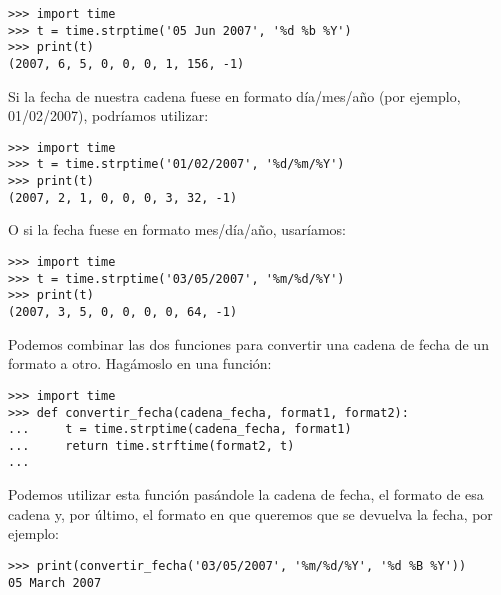 \begin{listingignore}
\begin{verbatim}
>>> import time
>>> t = time.strptime('05 Jun 2007', '%d %b %Y')
>>> print(t)
(2007, 6, 5, 0, 0, 0, 1, 156, -1)
\end{verbatim}
\end{listingignore}

\noindent
Si la fecha de nuestra cadena fuese en formato día/mes/año (por ejemplo, 01/02/2007), podríamos utilizar:

\begin{listingignore}
\begin{verbatim}
>>> import time
>>> t = time.strptime('01/02/2007', '%d/%m/%Y')
>>> print(t)
(2007, 2, 1, 0, 0, 0, 3, 32, -1)
\end{verbatim}
\end{listingignore}

\noindent
O si la fecha fuese en formato mes/día/año, usaríamos:

\begin{listingignore}
\begin{verbatim}
>>> import time
>>> t = time.strptime('03/05/2007', '%m/%d/%Y')
>>> print(t)
(2007, 3, 5, 0, 0, 0, 0, 64, -1)
\end{verbatim}
\end{listingignore}

\noindent
Podemos combinar las dos funciones para convertir una cadena de fecha de un formato a otro.  Hagámoslo en una función:

\begin{listing}
\begin{verbatim}
>>> import time
>>> def convertir_fecha(cadena_fecha, format1, format2):
...     t = time.strptime(cadena_fecha, format1)
...     return time.strftime(format2, t)
...
\end{verbatim}
\end{listing}

\noindent
Podemos utilizar esta función pasándole la cadena de fecha, el formato de esa cadena y, por último, el formato en que queremos que se devuelva la fecha, por ejemplo:

\begin{listing}
\begin{verbatim}
>>> print(convertir_fecha('03/05/2007', '%m/%d/%Y', '%d %B %Y'))
05 March 2007
\end{verbatim}
\end{listing}

\newpage
